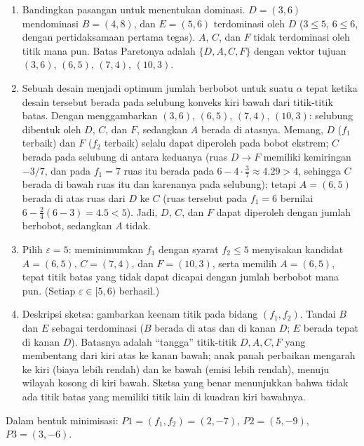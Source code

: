 \begin{enumerate}
\item Bandingkan pasangan untuk menentukan dominasi. $D = (3,6)$ mendominasi
$B = (4,8)$, dan $E = (5,6)$ terdominasi oleh $D$ ($3 \leq 5$, $6 \leq 6$,
dengan pertidaksamaan pertama tegas). $A$, $C$, dan $F$ tidak terdominasi oleh
titik mana pun. Batas Paretonya adalah $\{D, A, C, F\}$ dengan vektor tujuan
$(3,6)$, $(6,5)$, $(7,4)$, $(10,3)$.
\item Sebuah desain menjadi optimum jumlah berbobot untuk suatu $\alpha$ tepat
ketika desain tersebut berada pada selubung konveks kiri bawah dari titik-titik
batas. Dengan menggambarkan $(3,6)$, $(6,5)$, $(7,4)$, $(10,3)$: selubung dibentuk
oleh $D$, $C$, dan $F$, sedangkan $A$ berada di atasnya. Memang, $D$ ($f_1$
terbaik) dan $F$ ($f_2$ terbaik) selalu dapat diperoleh pada bobot ekstrem;
$C$ berada pada selubung di antara keduanya (ruas $D \to F$ memiliki kemiringan
$-3/7$, dan pada $f_1 = 7$ ruas itu berada pada
$6 - 4 \cdot \tfrac{3}{7} \approx 4.29 > 4$, sehingga $C$ berada di bawah ruas
itu dan karenanya pada selubung); tetapi $A = (6,5)$ berada di atas ruas dari
$D$ ke $C$ (ruas tersebut pada $f_1 = 6$ bernilai
$6 - \tfrac{2}{4}(6-3) = 4.5 < 5$). Jadi, $D$, $C$, dan $F$ dapat diperoleh
dengan jumlah berbobot, sedangkan $A$ tidak.
\item Pilih $\varepsilon = 5$: meminimumkan $f_1$ dengan syarat
$f_2 \leq 5$ menyisakan kandidat $A = (6,5)$, $C = (7,4)$, dan $F = (10,3)$,
serta memilih $A = (6,5)$, tepat titik batas yang tidak dapat dicapai dengan
jumlah berbobot mana pun. (Setiap $\varepsilon \in [5, 6)$ berhasil.)
\item Deskripsi sketsa: gambarkan keenam titik pada bidang $(f_1, f_2)$. Tandai $B$
dan $E$ sebagai terdominasi ($B$ berada di atas dan di kanan $D$; $E$ berada
tepat di kanan $D$). Batasnya adalah ``tangga'' titik-titik $D, A, C, F$ yang
membentang dari kiri atas ke kanan bawah; anak panah perbaikan mengarah ke kiri
(biaya lebih rendah) dan ke bawah (emisi lebih rendah), menuju wilayah kosong
di kiri bawah. Sketsa yang benar menunjukkan bahwa tidak ada titik batas yang
memiliki titik lain di kuadran kiri bawahnya.
\end{enumerate}


Dalam bentuk minimisasi: $P1 = (f_1, f_2) = (2, -7)$, $P2 = (5, -9)$,
$P3 = (3, -6)$.

